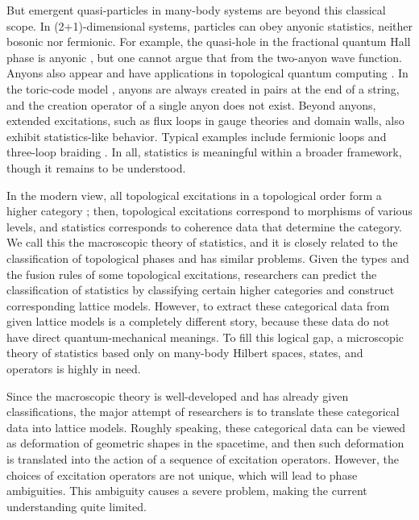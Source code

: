 \documentclass[reprint, amsmath, amssymb, showpacs, floatfix, longbibliography, aps, twocolumn, superscriptaddress, nofootinbib]{revtex4-2}
\theoremstyle{definition}
\begin{document}
But emergent quasi-particles in many-body systems are beyond this classical scope. In (2+1)-dimensional systems, particles can obey anyonic statistics, neither bosonic nor fermionic. For example, the quasi-hole in the fractional quantum Hall phase is anyonic \cite{Laughlin1983Anomalous, RevModPhys.71.875}, but one cannot argue that from the two-anyon wave function. 
 Anyons also appear and have applications in topological quantum computing \cite{freedman2003topological, Nayak2008NonAbelian, Kitaev:2005hzj}. In the toric-code model \cite{Kitaev_2003}, anyons are always created in pairs at the end of a string, and the creation operator of a single anyon does not exist. Beyond anyons, extended excitations, such as flux loops in gauge theories and domain walls, also exhibit statistics-like behavior. Typical examples include fermionic loops \cite{CH21,FHH21,Previous,Thorngren:2014pza,johnsonfreyd2021minimal,Johnson-Freyd:2020twl} and three-loop braiding \cite{Wang2014Braiding}. In all, statistics is meaningful within a broader framework, though it remains to be understood.

In the modern view, all topological excitations in a topological order form a higher category \cite{gaiotto2019condensationshighercategories,kong2024highercondensationtheory}; then, topological excitations correspond to morphisms of various levels, and statistics corresponds to coherence data that determine the category. We call this the macroscopic theory of statistics, and it is closely related to the classification of topological phases and has similar problems. Given the types and the fusion rules of some topological excitations, researchers can predict the classification of statistics by classifying certain higher categories and construct corresponding lattice models. However, to extract these categorical data from given lattice models is a completely different story, because these data do not have direct quantum-mechanical meanings. To fill this logical gap, a microscopic theory of statistics based only on many-body Hilbert spaces, states, and operators is highly in need.

Since the macroscopic theory is well-developed and has already given classifications, the major attempt of researchers is to translate these categorical data into lattice models. Roughly speaking, these categorical data can be viewed as deformation of geometric shapes in the spacetime, and then such deformation is translated into the action of a sequence of excitation operators.
However, the choices of excitation operators are not unique, which will lead to phase ambiguities. This ambiguity causes a severe problem, making the current understanding quite limited. 
\end{document}
